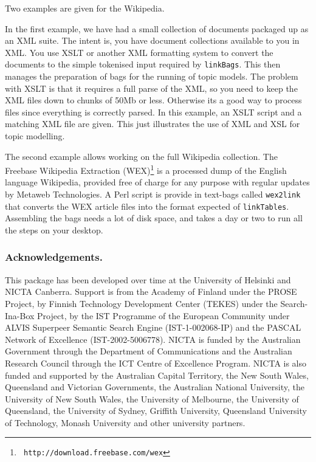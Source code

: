 \documentclass{article}
\begin{document}
Two examples are given for the Wikipedia.

In the first example, we have had a small collection of documents packaged up
as an XML suite. 
The intent is, you have document collections available to you in XML.
You use XSLT or another XML formatting system to convert the documents
to the simple tokenised input required by {\tt linkBags}.  This then
manages the preparation of bags for the running of topic models.
The problem with XSLT is that it requires a full parse of the XML,
so you need to keep the XML files down to chunks of 50Mb or less.
Otherwise its a good way to process files since everything is
correctly parsed.
In this example, an XSLT script and a matching XML file are given.
This just illustrates the use of XML and XSL for topic modelling.

The second example allows working on the full Wikipedia collection.
The Freebase Wikipedia Extraction (WEX)\footnote{\tt
http://download.freebase.com/wex} is a processed dump of the
English language Wikipedia, provided free of charge for any
purpose with regular updates by Metaweb Technologies.  
A Perl script is provide in text-bags called {\tt wex2link} that
converts the WEX article files into the format expected of
{\tt linkTables}.  Assembling the bags needs a lot of disk space, and takes
a day or two to run all the steps on your desktop.


\subsubsection*{Acknowledgements.}
This package has been developed over time at the
University of Helsinki and NICTA Canberra.
Support is from
the Academy of Finland under the
PROSE Project, by Finnish Technology Development Center (TEKES) under
the Search-Ina-Box Project, by the IST Programme of the European
Community under ALVIS Superpeer Semantic Search Engine
(IST-1-002068-IP) and the PASCAL Network of Excellence
(IST-2002-5006778).
NICTA is funded by the Australian Government through the Department of Communications and the Australian Research Council through the ICT Centre of Excellence Program. NICTA is also funded and supported by the Australian Capital Territory, the New South Wales, Queensland and Victorian Governments, the Australian National University, the University of New South Wales, the University of Melbourne, the University of Queensland, the University of Sydney, Griffith University, Queensland University of Technology, Monash University and other university partners. 
\end{document}

